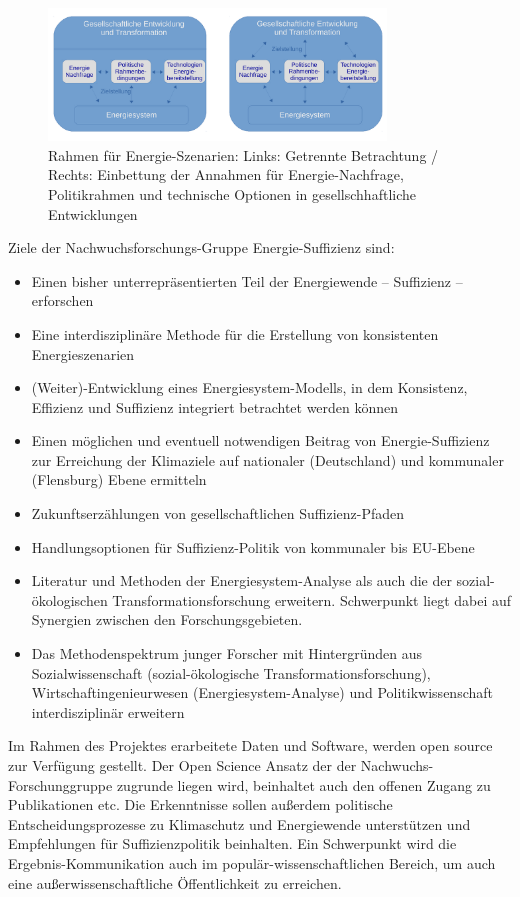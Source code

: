 \documentclass[a4paper,11pt,twoside]{scrartcl}
\begin{document}
\begin{figure}[!h]
    \centering
    \includegraphics[width=0.8\textwidth]{figures/Szenarien.pdf}
    \caption{Rahmen für Energie-Szenarien: Links: Getrennte Betrachtung / Rechts: Einbettung der Annahmen für Energie-Nachfrage, Politikrahmen und technische Optionen in gesellschhaftliche Entwicklungen}
    \label{fig:szenarien}
\end{figure}

Ziele der Nachwuchsforschungs-Gruppe Energie-Suffizienz sind:
\begin{itemize}
 \item Einen bisher unterrepräsentierten Teil der Energiewende -- Suffizienz -- erforschen
  \item Eine interdisziplinäre Methode für die Erstellung von konsistenten Energieszenarien
  \item (Weiter)-Entwicklung eines Energiesystem-Modells, in dem Konsistenz, Effizienz und Suffizienz integriert betrachtet werden können
 \item Einen möglichen und eventuell notwendigen Beitrag von Energie-Suffizienz zur Erreichung der Klimaziele auf nationaler (Deutschland) und kommunaler (Flensburg) Ebene ermitteln
 \item Zukunftserzählungen von gesellschaftlichen Suffizienz-Pfaden 
 \item Handlungsoptionen für Suffizienz-Politik von kommunaler bis EU-Ebene
 \item Literatur und Methoden der Energiesystem-Analyse als auch die der sozial-ökologischen Transformationsforschung erweitern. Schwerpunkt liegt dabei auf Synergien zwischen den Forschungsgebieten.
 \item Das Methodenspektrum junger Forscher mit Hintergründen aus Sozialwissenschaft (sozial-ökologische Transformationsforschung), Wirtschaftingenieurwesen (Energiesystem-Analyse) und Politikwissenschaft interdisziplinär erweitern
\end{itemize}

Im Rahmen des Projektes erarbeitete Daten und Software, werden open source zur Verfügung gestellt. Der Open Science Ansatz der der Nachwuchs-Forschunggruppe zugrunde liegen wird, beinhaltet auch den offenen Zugang zu Publikationen etc. Die Erkenntnisse sollen außerdem politische Entscheidungsprozesse zu Klimaschutz und Energiewende unterstützen und Empfehlungen für Suffizienzpolitik beinhalten. Ein Schwerpunkt wird die Ergebnis-Kommunikation auch im populär-wissenschaftlichen Bereich, um auch eine außerwissenschaftliche Öffentlichkeit zu erreichen.
\end{document}
